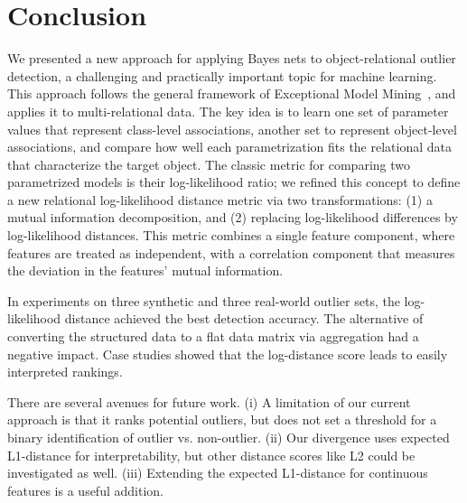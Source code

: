 \documentclass[conference]{IEEEtran}
\begin{document}
								
\section{Conclusion} We presented a new approach for applying Bayes nets to object-relational outlier detection, a challenging and practically important topic for machine learning. This approach follows the general framework of Exceptional Model Mining~\cite{Duivesteijn2016}, and applies it to multi-relational data. The key idea is to learn one set of parameter values that represent class-level associations, another set to represent object-level associations, and compare how well each parametrization fits the relational data that characterize the target object. The classic metric for comparing two parametrized models is their log-likelihood ratio; we refined this concept to define  a new relational log-likelihood distance metric via two transformations:  (1) a mutual information decomposition, and (2) replacing log-likelihood differences by log-likelihood distances. This metric combines a single feature component, where features are treated as independent, with a correlation component that measures the deviation in the features' mutual information.

In experiments on three synthetic and three real-world outlier sets, the log-likelihood distance achieved the best detection accuracy. The alternative of converting the structured data to a flat data matrix via aggregation had a negative impact. %
Case studies showed that the log-distance score leads to easily interpreted rankings.
%

 							
								There are several avenues for future work.  (i) A limitation of our current approach is that it ranks potential outliers, but does not set a threshold for a binary identification of outlier vs. non-outlier. (ii) Our divergence uses expected L1-distance for interpretability, but other distance scores like L2 could be investigated as well. (iii) Extending the expected L1-distance for continuous features is a useful addition. 
								
\end{document}
